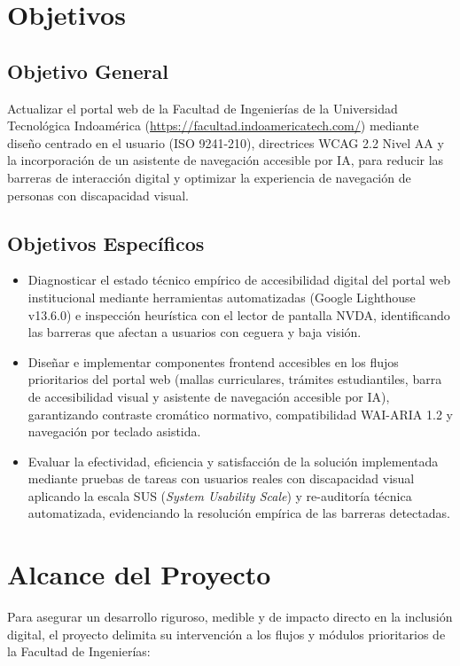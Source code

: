 \section{Objetivos}

\subsection{Objetivo General}
Actualizar el portal web de la Facultad de Ingenierías de la Universidad Tecnológica Indoamérica (\url{https://facultad.indoamericatech.com/}) mediante diseño centrado en el usuario (ISO 9241-210), directrices WCAG 2.2 Nivel AA y la incorporación de un asistente de navegación accesible por IA, para reducir las barreras de interacción digital y optimizar la experiencia de navegación de personas con discapacidad visual.

\subsection{Objetivos Específicos}
\begin{itemize}
  \item Diagnosticar el estado técnico empírico de accesibilidad digital del portal web institucional mediante herramientas automatizadas (Google Lighthouse v13.6.0) e inspección heurística con el lector de pantalla NVDA, identificando las barreras que afectan a usuarios con ceguera y baja visión.
  \item Diseñar e implementar componentes frontend accesibles en los flujos prioritarios del portal web (mallas curriculares, trámites estudiantiles, barra de accesibilidad visual y asistente de navegación accesible por IA), garantizando contraste cromático normativo, compatibilidad WAI-ARIA 1.2 y navegación por teclado asistida.
  \item Evaluar la efectividad, eficiencia y satisfacción de la solución implementada mediante pruebas de tareas con usuarios reales con discapacidad visual aplicando la escala SUS (\textit{System Usability Scale}) y re-auditoría técnica automatizada, evidenciando la resolución empírica de las barreras detectadas.
\end{itemize}

\section{Alcance del Proyecto}
Para asegurar un desarrollo riguroso, medible y de impacto directo en la inclusión digital, el proyecto delimita su intervención a los flujos y módulos prioritarios de la Facultad de Ingenierías:

